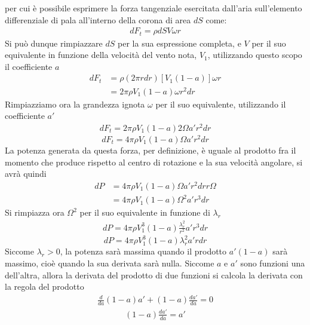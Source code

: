per cui è possibile esprimere la forza tangenziale esercitata dall'aria sull'elemento differenziale di pala all'interno della corona di area $dS$ come:
\begin{align*}
dF_t = \rho dS V \omega r
\end{align*}
Si può dunque rimpiazzare $dS$ per la sua espressione completa, e $V$ per il suo equivalente in funzione della velocità del vento nota, $V_1$, utilizzando questo scopo il coefficiente $a$
\begin{align*}
dF_t &= \rho \left( 2 \pi r dr \right) \left[ V_1 \left(1 -a \right) \right] \omega r\\
& = 2 \pi \rho V_1 \left( 1-a \right) \omega r^2 dr
\end{align*}
Rimpiazziamo ora la grandezza ignota $\omega$ per il suo equivalente, utilizzando il coefficiente $a'$
\begin{align*}
dF_t = 2 \pi \rho V_1 \left( 1- a \right) 2 \Omega a' r^2 dr
\end{align*}
\begin{equation}\label{eq:dftfin}
dF_t = 4 \pi \rho V_1 \left(1-a \right) \Omega a' r^2 dr
\end{equation}
La potenza generata da questa forza, per definizione, è uguale al prodotto fra il momento che produce rispetto al centro di rotazione e la sua velocità angolare, si avrà quindi
\begin{align*}
dP &= 4 \pi \rho V_1 \left( 1-a \right) \Omega a' r^2 dr r \Omega \\
&= 4 \pi \rho V_1 \left( 1-a \right) \Omega^2 a' r^3 dr
\end{align*}
Si rimpiazza ora $\Omega^2$ per il suo equivalente in funzione di $\lambda_r$
\begin{align*}
dP = 4 \pi \rho V_1^3 \left( 1- a \right) \frac{\lambda_r^2}{r^2} a' r^3 dr
\end{align*}
\begin{equation}\label{eq:dP}
dP = 4 \pi \rho V_1^3 \left( 1 - a \right) \lambda_r^2 a' r dr
\end{equation}
Siccome $\lambda_r > 0$, la potenza sarà massima quando il prodotto $a' \left( 1- a \right)$ sarà massimo, cioè quando la sua derivata sarà nulla. Siccome $a$ e $a'$ sono funzioni una dell'altra, allora la derivata del prodotto di due funzioni si calcola la derivata con la regola del prodotto
\begin{align*}
\frac{d}{da} \left( 1-a \right) a' + \left( 1 -a \right) \frac{da'}{da} = 0
\end{align*}
\begin{align*}
\left( 1- a \right) \frac{da'}{da} = a'
\end{align*}
